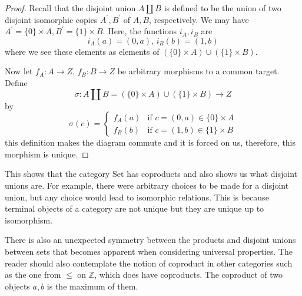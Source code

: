 \documentclass{report}
\begin{document}
\begin{proof}
    Recall that the disjoint union $A \coprod B$ is defined to be the union of two disjoint isomorphic copies $A^{\prime}, B^{\prime}$ of $A, B$, respectively. We may have $A^{\prime} = \{0\} \times A, B^{\prime} = \{1\} \times B$. Here, the functions $i_{A}, i_{B}$ are 
        \begin{equation*}
            i_{A}(a) = (0, a), \, i_{B}(b) = (1, b)
        \end{equation*}
    where we see these elements as elements of $(\{0\} \times A) \cup (\{1\} \times B)$.

    Now let $f_{A} : A \rightarrow Z$, $f_{B} : B \rightarrow Z$ be arbitrary morphisms to a common target. Define
        \begin{equation*}
            \sigma : A \coprod B = (\{0\} \times A) \cup (\{1\} \times B) \rightarrow Z
        \end{equation*}
    by
        \begin{equation*}
            \sigma(c) = 
                \begin{cases}
                    f_{A}(a) & \text{if } c = (0, a) \in \{0\} \times A\\
                    f_{B}(b) & \text{if } c = (1, b) \in \{1\} \times B
                \end{cases}
        \end{equation*}
    this definition makes the diagram commute and it is forced on us, therefore, this morphism is unique.
\end{proof}

This shows that the category $\text{Set}$ has coproducts and also shows us what disjoint unions are. For example, there were arbitrary choices to be made for a disjoint union, but any choice would lead to isomorphic relations. This is because terminal objects of a category are not unique but they are unique up to isomorphism.

There is also an unexpected symmetry between the products and disjoint unions between sets that becomes apparent when considering universal properties. The reader should also contemplate the notion of coproduct in other categories such as the one from $\leq $ on $\mathbb{Z}$, which does have coproducts. The coproduct of two objects $a, b$ is the maximum of them.
\end{document}
